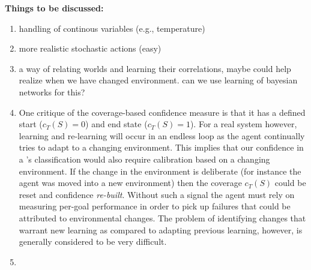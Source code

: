 \bigskip
\textbf{Things to be discussed:}
\begin{enumerate}
  \item handling of continous variables (e.g., temperature)
  \item more realistic stochastic actions (easy)
  \item a way of relating worlds and learning their correlations, maybe
  could help realize when we have changed environment. can we use learning of
  bayesian networks for this?
  
\item One critique of the coverage-based confidence measure is that it has a
defined start ($c_T(S)=0$) and end state ($c_T(S)=1$). For a real
system however, learning and re-learning will occur in an endless loop
as the agent continually tries to adapt to a changing
environment. This implies that our confidence in a \dt's
classification would also require calibration based on a changing
environment. If the change in the environment is deliberate (for
instance the agent was moved into a new environment) then the coverage
$c_T(S)$ could be reset and confidence \textit{re-built}. Without such
a signal the agent must rely on measuring per-goal performance in
order to pick up failures that could be attributed to environmental
changes. The problem of identifying changes that warrant new learning
as compared to adapting previous learning, however, is generally
considered to be very difficult.
   \item  
\end{enumerate}


